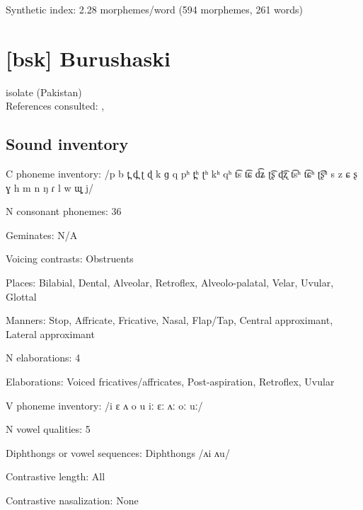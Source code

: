 {\begin{appendixdesc}
\item[Synthetic index:] 2.28 morphemes/word (594 morphemes, 261 words)
\end{appendixdesc}
\section*{[bsk] Burushaski} %
isolate (Pakistan)\medskip\\
References consulted: \citet{Anderson1997}, \citet{Yoshioka2012}

\subsection*{Sound inventory}
\begin{appendixdesc}

\item[C phoneme inventory:] /p b t̪ d̪ ʈ ɖ k ɡ q pʰ t̪ʰ ʈʰ kʰ qʰ t͡s t͡ɕ d͡ʑ ʈ͡ʂ ɖ͡ʐ t͡sʰ t͡ɕʰ ʈ͡ʂʰ s z ɕ ʂ ɣ h m n ŋ ɾ l w ɰ̟ j/

\item[N consonant phonemes:] 36

\item[Geminates:] N/A

\item[Voicing contrasts:] Obstruents

\item[Places:] Bilabial, Dental, Alveolar, Retroflex, Alveolo-palatal, Velar, Uvular, Glottal

\item[Manners:] Stop, Affricate, Fricative, Nasal, Flap/Tap, Central approximant, Lateral approximant

\item[N elaborations:] 4

\item[Elaborations:] Voiced fricatives/affricates, Post-aspiration, Retroflex, Uvular

\item[V phoneme inventory:] /i ɛ ʌ o u iː ɛː ʌː oː uː/

\item[N vowel qualities:] 5

\item[Diphthongs or vowel sequences:] Diphthongs /ʌi ʌu/

\item[Contrastive length:] All

\item[Contrastive nasalization:] None


\end{appendixdesc}}
